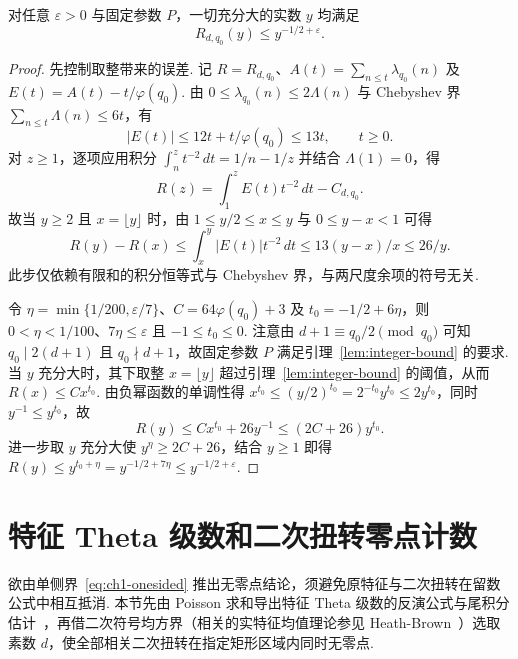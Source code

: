 \begin{theorem}[加权素数幂余项的单侧上界]
\label{thm:one-sided}
\emitthmsource
对任意 $\varepsilon>0$ 与固定参数 $P$，一切充分大的实数 $y$ 均满足
\begin{equation}
 R_{d,q_0}(y)\le y^{-1/2+\varepsilon}.
\label{eq:ch1-onesided}
\end{equation}
\end{theorem}
\begin{proof}
先控制取整带来的误差. 记 $R=R_{d,q_0}$、$A(t)=\sum_{n\le t}\lambda_{q_0}(n)$ 及 $E(t)=A(t)-t/\varphi(q_0)$. 由 $0\le\lambda_{q_0}(n)\le2\Lambda(n)$ 与 Chebyshev 界 $\sum_{n\le t}\Lambda(n)\le6t$，有
\[
 |E(t)|\le 12t+t/\varphi(q_0)\le13t,\qquad t\ge0.
\]
对 $z\ge1$，逐项应用积分 $\int_n^z t^{-2}\,dt=1/n-1/z$ 并结合 $\Lambda(1)=0$，得
\[
 R(z)=\int_1^z E(t)t^{-2}\,dt-C_{d,q_0}.
\]
故当 $y\ge2$ 且 $x=\lfloor y\rfloor$ 时，由 $1\le y/2\le x\le y$ 与 $0\le y-x<1$ 可得
\[
 R(y)-R(x)
   \le \int_x^y |E(t)|t^{-2}\,dt
   \le 13(y-x)/x\le26/y.
\]
此步仅依赖有限和的积分恒等式与 Chebyshev 界，与两尺度余项的符号无关.

令 $\eta=\min\{1/200,\varepsilon/7\}$、$C=64\varphi(q_0)+3$ 及 $t_0=-1/2+6\eta$，则 $0<\eta<1/100$、$7\eta\le\varepsilon$ 且 $-1\le t_0\le0$. 注意由 $d+1\equiv q_0/2\pmod{q_0}$ 可知 $q_0\mid2(d+1)$ 且 $q_0\nmid d+1$，故固定参数 $P$ 满足引理~\ref{lem:integer-bound} 的要求. 当 $y$ 充分大时，其下取整 $x=\lfloor y\rfloor$ 超过引理~\ref{lem:integer-bound} 的阈值，从而 $R(x)\le Cx^{t_0}$. 由负幂函数的单调性得 $x^{t_0}\le(y/2)^{t_0}=2^{-t_0}y^{t_0}\le2y^{t_0}$，同时 $y^{-1}\le y^{t_0}$，故
\[
 R(y)\le Cx^{t_0}+26y^{-1}\le (2C+26)y^{t_0}.
\]
进一步取 $y$ 充分大使 $y^\eta\ge2C+26$，结合 $y\ge1$ 即得 $R(y)\le y^{t_0+\eta}=y^{-1/2+7\eta}\le y^{-1/2+\varepsilon}$.
\end{proof}

\section{特征 Theta 级数和二次扭转零点计数}
\label{sec:twist-density}

欲由单侧界~\eqref{eq:ch1-onesided} 推出无零点结论，须避免原特征与二次扭转在留数公式中相互抵消. 本节先由 Poisson 求和导出特征 Theta 级数的反演公式与尾积分估计~\cite{Davenport2000,MontgomeryVaughan2007}，再借二次符号均方界（相关的实特征均值理论参见 Heath-Brown~\cite{HeathBrown1995}）选取素数 $d$，使全部相关二次扭转在指定矩形区域内同时无零点.

